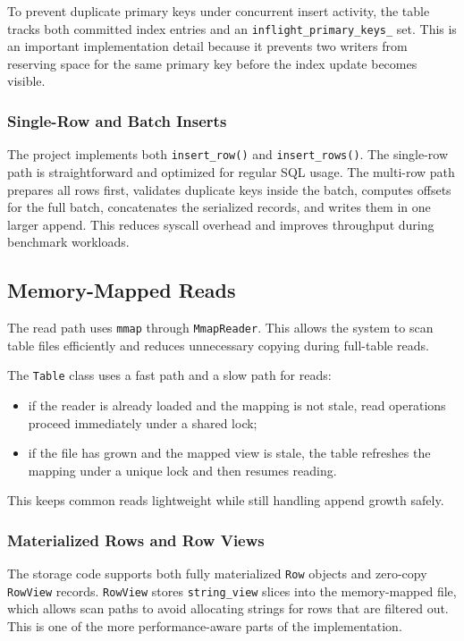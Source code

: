 \documentclass[12pt,a4paper]{article}
\begin{document}
To prevent duplicate primary keys under concurrent insert activity, the table
tracks both committed index entries and an \texttt{inflight\_primary\_keys\_}
set. This is an important implementation detail because it prevents two writers
from reserving space for the same primary key before the index update becomes
visible.

\subsubsection{Single-Row and Batch Inserts}

The project implements both \texttt{insert\_row()} and \texttt{insert\_rows()}.
The single-row path is straightforward and optimized for regular SQL usage.
The multi-row path prepares all rows first, validates duplicate keys inside the
batch, computes offsets for the full batch, concatenates the serialized
records, and writes them in one larger append. This reduces syscall overhead
and improves throughput during benchmark workloads.

\subsection{Memory-Mapped Reads}

The read path uses \texttt{mmap} through \texttt{MmapReader}. This allows the
system to scan table files efficiently and reduces unnecessary copying during
full-table reads.

The \texttt{Table} class uses a fast path and a slow path for reads:

\begin{itemize}[leftmargin=1.8em]
  \item if the reader is already loaded and the mapping is not stale, read
        operations proceed immediately under a shared lock;
  \item if the file has grown and the mapped view is stale, the table refreshes
        the mapping under a unique lock and then resumes reading.
\end{itemize}

This keeps common reads lightweight while still handling append growth safely.

\subsubsection{Materialized Rows and Row Views}

The storage code supports both fully materialized \texttt{Row} objects and
zero-copy \texttt{RowView} records. \texttt{RowView} stores
\texttt{string\_view} slices into the memory-mapped file, which allows scan
paths to avoid allocating strings for rows that are filtered out. This is one
of the more performance-aware parts of the implementation.
\end{document}
